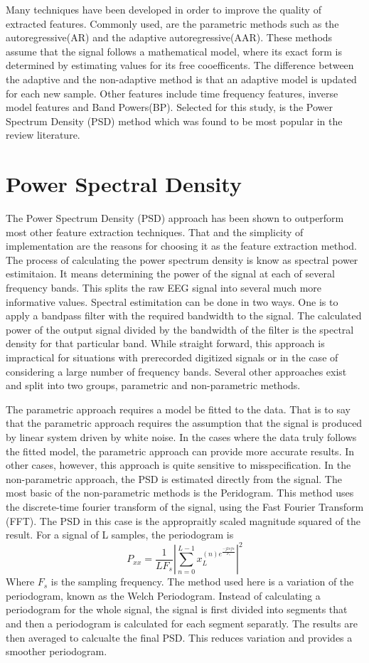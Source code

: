 \documentclass[12pt, a4paper, fleqn]{memoir}%
\begin{document}
Many techniques have been developed in order to improve the quality of extracted features. Commonly used, are the parametric methods such as the autoregressive(AR) and the adaptive autoregressive(AAR). These methods assume that the signal follows a mathematical model, where its exact form is determined by estimating values for its free cooefficents. The difference between the adaptive and the non-adaptive method is that an adaptive model is updated for each new sample\cite{pardey1996review}. Other features include time frequency features, inverse model features and Band Powers(BP). Selected for this study, is the Power Spectrum Density (PSD) method which was found to be most popular in the review literature.

\section{Power Spectral Density}
\label{sec:psd}
The Power Spectrum Density (PSD) approach has been shown to outperform most other feature extraction techniques\cite{du2004temporal}. That and the simplicity of implementation are the reasons for choosing it as the feature extraction method. The process of calculating the power spectrum density is know as spectral power estimitaion. It means determining the power of the signal at each of several frequency bands. This splits the raw EEG signal into several much more informative values. Spectral estimitation can be done in two ways. One is to apply a bandpass filter with the required bandwidth to the signal. The calculated power of the output signal divided by the bandwidth of the filter is the spectral density for that particular band. While straight forward, this approach is impractical for situations with prerecorded digitized signals or in the case of considering a large number of frequency bands. Several other approaches exist and split into two groups, parametric and non-parametric methods\cite{stoica2005spectra}.

The parametric approach requires a model be fitted to the data. That is to say that the parametric approach requires the assumption that the signal is produced by linear system driven by white noise. In the cases where the data truly follows the fitted model, the parametric approach can provide more accurate results. In other cases, however, this approach is quite sensitive to misspecification. In the non-parametric approach, the PSD is estimated directly from the signal. The most basic of the non-parametric methods is the Peridogram. This method uses the discrete-time fourier transform of the signal, using the Fast Fourier Transform (FFT). The PSD in this case is the appropraitly scaled magnitude squared of the result.
For a signal of L samples, the periodogram is
$$P_{xx}=\frac{1}{LF_s}|\sum_{n=0}^{L-1}x_L^{(n)e^{\frac{-j2\pi fn}{F_s}}}|^{2}$$
Where $F_s$ is the sampling frequency.
The method used here is a variation of the periodogram, known as the Welch Periodogram. Instead of calculating a periodogram for the whole signal, the signal is first divided into segments that and then a periodogram is calculated for each segment separatly. The results are then averaged to calcualte the final PSD. This reduces variation and provides a smoother periodogram\cite{john1996digital}.
\end{document}
